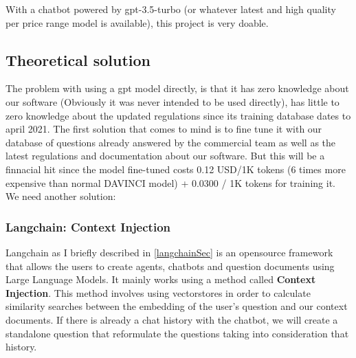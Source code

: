 \documentclass[a4paper,12pt,twoside]{report}
\begin{document}
With a chatbot powered by gpt-3.5-turbo (or whatever latest and high quality per price range model is available), this project is very doable.
\subsection{Theoretical solution}
The problem with using a gpt model directly, is that it has zero knowledge about our software (Obviously it was never intended to be used directly), has little to zero knowledge about the updated regulations since its training database dates to april 2021. 
The first solution that comes to mind is to fine tune it with our database of questions already answered by the commercial team as well as the latest regulations and documentation about our software. But this will be a finnacial hit since the model fine-tuned costs 0.12 USD/1K tokens (6 times more expensive than normal DAVINCI model) + 0.0300 / 1K tokens for training it. We need another solution:
\subsubsection{Langchain: Context Injection}
Langchain as I briefly described in \ref{langchainSec} is an opensource framework that allows the users to create agents, chatbots and question documents using Large Language Models. It mainly works using a method called \textbf{Context Injection}. This method involves using vectorstores in order to calculate similarity searches between the embedding of the user's question and our context documents. If there is already a chat history with the chatbot, we will create a standalone question that reformulate the questions taking into consideration that history.
\end{document}

